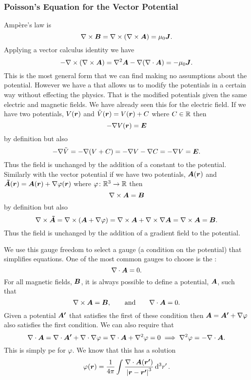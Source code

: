     \subsubsection{Poisson's Equation for the Vector Potential}
    Amp\`ere's law is
    \[\nabla\times\bm{B} = \nabla\times(\nabla\times\bm{A}) = \mu_0\bm{J}.\]
    Applying a vector calculus identity we have
    \begin{equation}\label{eqn:curl A = laplacian A - grad div A = -mu0 J}
        -\nabla\times(\nabla\times\bm{A}) = \nabla^2\bm{A} - \nabla(\nabla\cdot\bm{A}) = -\mu_0\bm{J}.
    \end{equation}
    This is the most general form that we can find making no assumptions about the potential.
    However we have a  that allows us to modify the potentials in a certain way without effecting the physics.
    That is the modified potentials given the same electric and magnetic fields.
    We have already seen this for the electric field.
    If we have two potentials, \(V(\bm{r})\) and \(\tilde{V}(\bm{r}) = V(\bm{r}) + C\) where \(C\in\mathbb{R}\) then
    \[-\nabla V(\bm{r}) = \bm{E}\]
    by definition but also
    \[-\nabla\tilde{V} = -\nabla(V + C) = -\nabla V - \nabla C = -\nabla V = \bm{E}.\]
    Thus the field is unchanged by the addition of a constant to the potential.
    Similarly with the vector potential if we have two potentials, \(\bm{A}(\bm{r})\) and \(\bm{\tilde{A}}(\bm{r}) = \bm{A}(\bm{r}) + \nabla\varphi(\bm{r})\) where \(\varphi\colon\mathbb{R}^3\to\mathbb{R}\) then
    \[\nabla\times\bm{A} = \bm{B}\]
    by definition but also
    \[\nabla\times\bm{\tilde{A}} = \nabla\times(\bm{A} + \nabla\varphi) = \nabla\times\bm{A} + \nabla\times\nabla\bm{A} = \nabla\times\bm{A} = \bm{B}.\]
    Thus the field is unchanged by the addition of a gradient field to the potential.
    
    We use this gauge freedom to select a gauge (a condition on the potential) that simplifies equations.
    One of the most common gauges to choose is the :
    \[\nabla\cdot\bm{A} = 0.\]
    For all magnetic fields, \(\bm{B}\), it is always possible to define a potential, \(\bm{A}\), such that
    \[\nabla\times\bm{A} = \bm{B},\qquad\text{and}\qquad \nabla\cdot\bm{A} = 0.\]
    Given a potential \(\bm{A'}\) that satisfies the first of these condition then \(\bm{A} = \bm{A'} + \nabla\varphi\) also satisfies the first condition.
    We can also require that
    \[\nabla\cdot\bm{A} = \nabla\cdot\bm{A'} + \nabla\cdot\nabla\varphi = \nabla\cdot\bm{A} + \nabla^2\varphi = 0 \implies \nabla^2\varphi = -\nabla\cdot\bm{A}.\]
    This is simply \gls{pe} for \(\varphi\).
    We know that this has a solution
    \[\varphi(\bm{r}) = \frac{1}{4\pi}\int\frac{\nabla\cdot\bm{A}(\bm{r'})}{\abs{\bm{r} - \bm{r'}}^3}\dd[3]{r'}.\]
    
